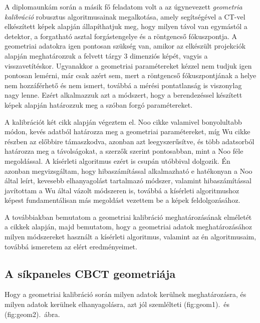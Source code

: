 \documentclass[a4paper,12pt]{article}
\begin{document}
A diplomaunkám során a másik fő feladatom volt a  az úgynevezett \emph{geometria kalibráció} robusztus algoritmusainak megalkotása, amely segítségével a CT-vel elkészített képek alapján állapíthatjuk meg, hogy milyen távol van egymástól a detektor, a forgatható asztal forgástengelye és a röntgencső fókuszpontja. A geometriai adatokra igen pontosan szükség van, amikor az elkészült projekciók alapján meghatározzuk a felvett tárgy 3 dimenziós képét, vagyis a visszavetítéskor. Ugyanakkor a geometriai paramétereket kézzel nem tudjuk igen pontosan lemérni, már csak azért sem, mert a röntgencső fókuszpontjának a helye nem hozzáférhető és nem ismert, továbbá a mérési pontatlanság is viszonylag nagy lenne. Ezért alkalmazzuk azt a módszert, hogy a berendezéssel készített képek alapján határozzuk meg a szóban forgó paramétereket. 

A kalibrációt két cikk alapján végeztem el. Noo cikke\cite{noo} valamivel bonyolultabb  módon, kevés adatból határozza meg a geometriai paramétereket, míg Wu\cite{wu} cikke részben az előbbire támaszkodva, azonban azt leegyszerűsítve,  és több adatsorból határozza meg a távolságokat, a szerzők szerint pontosabban, mint a Noo féle megoldással. A kísérleti algoritmus ezért is csupán utóbbival dolgozik. Én azonban megvizsgáltam, hogy hibaszámítással alkalmazható e hatékonyan a Noo által leírt, kevesebb elhanyagolást tartalmazó módszer, valamint hibaszámítással javítottam a Wu által vázolt módszeren is, továbbá a kísérleti algoritmushoz képest fundamentálisan más megoldást vezettem be a képek feldolgozásához.

 A továbbiakban bemutatom a geometriai kalibráció meghatározásának elméletét a cikkek alapján, majd bemutatom, hogy a geometriai adatok meghatározásához milyen módszereket használt a kísérleti algoritmus, valamint az én algoritmusaim, továbbá ismeretem az elért eredményeimet. 

\subsection{A síkpaneles CBCT geometriája}

Hogy a geometriai kalibráció során milyen adatok kerülnek meghatározásra, és milyen adatok kerülnek elhanyagolásra, azt jól szemlélteti \aref({fig:geom1}).\ és \aref({fig:geom2}).~ábra. 
\end{document}
